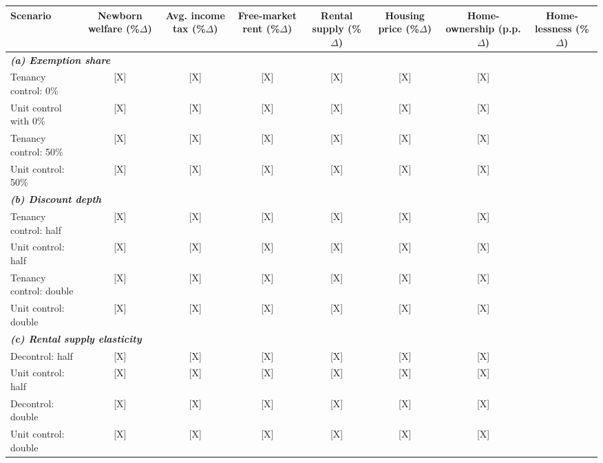 \begin{table}[p]
\footnotesize
\renewcommand{\arraystretch}{1.2}
\begin{center}
\begin{tabular}{lccccccc}
\toprule
\textbf{Scenario} 
& \shortstack{\textbf{Newborn} \\ \textbf{welfare} \\ (\%$\Delta$)}
& \shortstack{\textbf{Avg. income} \\ \textbf{tax} \\  \\ (\%$\Delta$)}
& \shortstack{\textbf{Free-market} \\ \textbf{rent} \\ (\%$\Delta$)}
& \shortstack{\textbf{Rental} \\ \textbf{supply} \\ (\%$\Delta$)}
& \shortstack{\textbf{Housing} \\ \textbf{price} \\ (\%$\Delta$)}
& \shortstack{\textbf{Home-} \\ \textbf{ownership} \\ (p.p.$\Delta$)} 
& \shortstack{\textbf{Home-} \\ \textbf{lessness} \\ (\%$\Delta$)} \\
\midrule
\midrule
\multicolumn{7}{l}{\textit{\textbf{(a) Exemption share}}} \\
Tenancy control: 0\% & [X] & [X] & [X] & [X] & [X] & [X] & \\
Unit control with 0\% & [X] & [X] & [X] & [X] & [X] & [X] & \\
Tenancy control: 50\% & [X] & [X] & [X] & [X] & [X] & [X] & \\
Unit control: 50\% & [X] & [X] & [X] & [X] & [X] & [X] & \\
\midrule
\multicolumn{7}{l}{\textit{\textbf{(b) Discount depth}}} \\
Tenancy control: half & [X] & [X] & [X] & [X] & [X] & [X] & \\
Unit control: half & [X] & [X] & [X] & [X] & [X] & [X] & \\
Tenancy control: double & [X] & [X] & [X] & [X] & [X] & [X] & \\
Unit control: double & [X] & [X] & [X] & [X] & [X] & [X] & \\
\midrule
\multicolumn{7}{l}{\textit{\textbf{(c) Rental supply elasticity}}} \\
Decontrol: half & [X] & [X] & [X] & [X] & [X] & [X] & \\
Unit control: half & [X] & [X] & [X] & [X] & [X] & [X] & \\
Decontrol: double & [X] & [X] & [X] & [X] & [X] & [X] & \\
Unit control: double & [X] & [X] & [X] & [X] & [X] & [X] & \\
\bottomrule
\end{tabular}
\end{center}
\normalsize
\end{table}